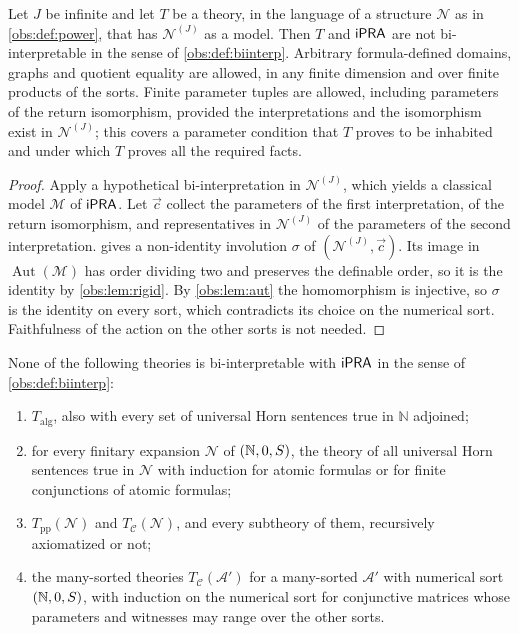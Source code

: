 \begin{theorem}
\label{obs:thm:symmetry}
Let $J$ be infinite and let $T$ be a theory, in the language of a structure
$\mathcal{N}$ as in \cref{obs:def:power}, that has $\mathcal{N}^{(J)}$ as a
model. Then $T$ and $\mathsf{iPRA}$ are not bi-interpretable in the sense of
\cref{obs:def:biinterp}. Arbitrary formula-defined domains, graphs and quotient
equality are allowed, in any finite dimension and over finite products of the
sorts. Finite parameter tuples are allowed, including parameters of the return
isomorphism, provided the interpretations and the isomorphism exist in
$\mathcal{N}^{(J)}$; this covers a parameter condition that $T$ proves to be
inhabited and under which $T$ proves all the required facts.
\end{theorem}

\begin{proof}
Apply a hypothetical bi-interpretation in $\mathcal{N}^{(J)}$, which yields a
classical model $\mathcal{M}$ of $\mathsf{iPRA}$. Let $\vec c$ collect the parameters
of the first interpretation, of the return isomorphism, and representatives in
$\mathcal{N}^{(J)}$ of the parameters of the second interpretation.
 gives a non-identity involution $\sigma$ of
$(\mathcal{N}^{(J)},\vec c)$. Its image in $\operatorname{Aut}(\mathcal{M})$
has order dividing two and preserves the definable order, so it is the identity
by \cref{obs:lem:rigid}. By \cref{obs:lem:aut} the homomorphism is injective,
so $\sigma$ is the identity on every sort, which contradicts its choice on the
numerical sort. Faithfulness of the action on the other sorts is not needed.
\end{proof}

\begin{corollary}
\label{obs:cor:symmetry-cases}
None of the following theories is bi-interpretable with $\mathsf{iPRA}$ in the sense of
\cref{obs:def:biinterp}:
\begin{enumerate}[label=(\roman*)]
\item $T_{\mathrm{alg}}$, also with every set of universal Horn sentences true
in $\mathbb{N}$ adjoined;
\item for every finitary expansion $\mathcal{N}$ of $(\mathbb{N},0,S)$, the
theory of all universal Horn sentences true in $\mathcal{N}$ with induction for
atomic formulas or for finite conjunctions of atomic formulas;
\item $T_{\mathrm{pp}}(\mathcal{N})$ and $T_{\mathcal{C}}(\mathcal{N})$, and
every subtheory of them, recursively axiomatized or not;
\item the many-sorted theories $T_{\mathcal{C}}(\mathcal{A}')$ for a
many-sorted $\mathcal{A}'$ with numerical sort $(\mathbb{N},0,S)$, with
induction on the numerical sort for conjunctive matrices whose parameters and
witnesses may range over the other sorts.
\end{enumerate}
\end{corollary}

